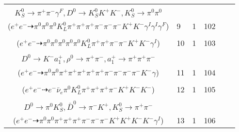 \documentclass[landscape]{article}
\newcounter{rownumbers}
\newcommand\rn{\stepcounter{rownumbers}\arabic{rownumbers}}
\newcommand{\EOLP}{\\ \hline} %
\newcommand{\topoTags}[1]{#1} %
\begin{document}
\begin{longtable}{clcccc}
\rn & \makecell[l]{ $ 
e^{+} e^{-} \rightarrow K^{0} \bar{K}^{0} D^{-} D^{*+} \gamma^{I} \gamma^{I} ,
K^{0} \rightarrow K_{S}^{0} ,
\bar{K}^{0} \rightarrow K_{S}^{0} ,
D^{-} \rightarrow \pi^{0} K_{L}^{0} \pi^{-} ,
D^{*+} \rightarrow \pi^{+} D^{0} ,
K_{S}^{0} \rightarrow \pi^{+} \pi^{-} ,
$ \\ $
K_{S}^{0} \rightarrow \pi^{+} \pi^{-} \gamma^{F} ,
D^{0} \rightarrow K_{S}^{0} K^{+} K^{-} ,
K_{S}^{0} \rightarrow \pi^{0} \pi^{0} 
$ \\ ($
e^{+} e^{-} \dashrightarrow \pi^{0} \pi^{0} \pi^{0} K_{L}^{0} \pi^{+} \pi^{+} \pi^{+} \pi^{-} \pi^{-} \pi^{-} K^{+} K^{-} \gamma^{I} \gamma^{I} \gamma^{F} 
$) } & \topoTags{9 & }1 & 102 \EOLP

\rn & \makecell[l]{ $ 
e^{+} e^{-} \rightarrow \pi^{0} \pi^{-} \rho^{+} D^{*-} D_{2}^{*+} \gamma^{I} ,
\rho^{+} \rightarrow \pi^{0} \pi^{+} ,
D^{*-} \rightarrow \pi^{0} D^{-} ,
D_{2}^{*+} \rightarrow \pi^{0} D^{+} ,
D^{-} \rightarrow \pi^{0} K_{L}^{0} \pi^{-} ,
D^{+} \rightarrow \pi^{+} K^{+} K^{-} 
$ \\ ($
e^{+} e^{-} \dashrightarrow \pi^{0} \pi^{0} \pi^{0} \pi^{0} \pi^{0} K_{L}^{0} \pi^{+} \pi^{+} \pi^{-} \pi^{-} K^{+} K^{-} \gamma^{I} 
$) } & \topoTags{10 & }1 & 103 \EOLP

\rn & \makecell[l]{ $ 
e^{+} e^{-} \rightarrow \pi^{+} \rho^{-} \bar{D}^{0} D^{*0} ,
\rho^{-} \rightarrow \pi^{0} \pi^{-} ,
\bar{D}^{0} \rightarrow K_{S}^{0} \eta^{\prime} ,
D^{*0} \rightarrow \pi^{0} D^{0} ,
K_{S}^{0} \rightarrow \pi^{+} \pi^{-} ,
\eta^{\prime} \rightarrow \rho^{0} \gamma ,
$ \\ $
D^{0} \rightarrow K^{-} a_{1}^{+} ,
\rho^{0} \rightarrow \pi^{+} \pi^{-} ,
a_{1}^{+} \rightarrow \pi^{+} \pi^{+} \pi^{-} 
$ \\ ($
e^{+} e^{-} \dashrightarrow \pi^{0} \pi^{0} \pi^{+} \pi^{+} \pi^{+} \pi^{+} \pi^{+} \pi^{-} \pi^{-} \pi^{-} \pi^{-} K^{-} \gamma 
$) } & \topoTags{11 & }1 & 104 \EOLP

\rn & \makecell[l]{ $ 
e^{+} e^{-} \rightarrow \rho^{0} \pi^{+} D_{2}^{*-} D^{0} ,
\rho^{0} \rightarrow \pi^{+} \pi^{-} ,
D_{2}^{*-} \rightarrow \pi^{0} D^{-} ,
D^{0} \rightarrow \pi^{+} K^{+} K^{-} K^{-} ,
D^{-} \rightarrow e^{-} \bar{\nu}_{e} K^{0} ,
K^{0} \rightarrow K_{L}^{0} 
$ \\ ($
e^{+} e^{-} \dashrightarrow e^{-} \bar{\nu}_{e} \pi^{0} K_{L}^{0} \pi^{+} \pi^{+} \pi^{+} \pi^{-} K^{+} K^{-} K^{-} 
$) } & \topoTags{12 & }1 & 105 \EOLP

\rn & \makecell[l]{ $ 
e^{+} e^{-} \rightarrow K^{0} K^{-} \phi D^{*+} \bar{D}^{*0} \gamma^{I} ,
K^{0} \rightarrow K_{S}^{0} ,
\phi \rightarrow K^{+} K^{-} ,
D^{*+} \rightarrow \pi^{+} D^{0} ,
\bar{D}^{*0} \rightarrow \pi^{0} \bar{D}^{0} ,
K_{S}^{0} \rightarrow \pi^{+} \pi^{-} ,
$ \\ $
D^{0} \rightarrow \pi^{0} K_{S}^{0} ,
\bar{D}^{0} \rightarrow \pi^{-} K^{+} ,
K_{S}^{0} \rightarrow \pi^{+} \pi^{-} 
$ \\ ($
e^{+} e^{-} \dashrightarrow \pi^{0} \pi^{0} \pi^{+} \pi^{+} \pi^{+} \pi^{-} \pi^{-} \pi^{-} K^{+} K^{+} K^{-} K^{-} \gamma^{I} 
$) } & \topoTags{13 & }1 & 106 \EOLP


\end{longtable}
\end{document}
